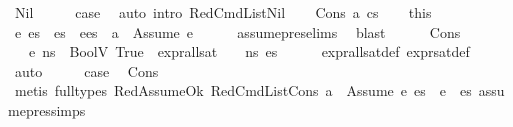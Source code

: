 \begin{isabellebody}
\ Nil\isanewline
\ \ \isamarkupfalse%
\ \isamarkupfalse%
\ {\isacharquery}{\kern0pt}case\ \isamarkupfalse%
\ {\isacharparenleft}{\kern0pt}auto\ intro{\isacharcolon}{\kern0pt}\ RedCmdListNil{\isacharparenright}{\kern0pt}\isanewline
{}\isamarkupfalse%
\isanewline
\ \ \isamarkupfalse%
\ {\isacharparenleft}{\kern0pt}Cons\ a\ cs{\isacharparenright}{\kern0pt}\isanewline
\ \ \isamarkupfalse%
\ this\ \isamarkupfalse%
\ e\ es{\isacharprime}{\kern0pt}\ \ {\isachardoublequoteopen}es\ {\isacharequal}{\kern0pt}\ e{\isacharhash}{\kern0pt}es{\isacharprime}{\kern0pt}{\isachardoublequoteclose}\ \ {\isachardoublequoteopen}a\ {\isacharequal}{\kern0pt}\ Assume\ e{\isachardoublequoteclose}\isanewline
\ \ \ \ \isamarkupfalse%
\ assume{\isacharunderscore}{\kern0pt}pres{\isachardot}{\kern0pt}elims{\isacharparenleft}{\kern0pt}{}{\isacharparenright}{\kern0pt}\ \isamarkupfalse%
\ blast\ \ \isanewline
\ \ \isamarkupfalse%
\ Cons\ \isamarkupfalse%
\ {\isachardoublequoteopen}{\isasymLambda}{\isacharcomma}{\kern0pt}{\isasymGamma}{\isacharcomma}{\kern0pt}{\isasymOmega}\ {\isasymturnstile}\ {\isasymlangle}e{\isacharcomma}{\kern0pt}\ ns{\isasymrangle}\ {\isasymDown}\ BoolV\ True{\isachardoublequoteclose}\ \ {\isachardoublequoteopen}expr{\isacharunderscore}{\kern0pt}all{\isacharunderscore}{\kern0pt}sat\ {\isasymLambda}\ {\isasymGamma}\ {\isasymOmega}\ ns\ es{\isacharprime}{\kern0pt}{\isachardoublequoteclose}\isanewline
\ \ \ \ \isamarkupfalse%
\ expr{\isacharunderscore}{\kern0pt}all{\isacharunderscore}{\kern0pt}sat{\isacharunderscore}{\kern0pt}def\ expr{\isacharunderscore}{\kern0pt}sat{\isacharunderscore}{\kern0pt}def\isanewline
\ \ \ \ \isamarkupfalse%
\ auto\isanewline
\ \ \isamarkupfalse%
\ \isamarkupfalse%
\ {\isacharquery}{\kern0pt}case\ \isamarkupfalse%
\ Cons\isanewline
\ \ \ \ \isamarkupfalse%
\ {\isacharparenleft}{\kern0pt}metis\ {\isacharparenleft}{\kern0pt}full{\isacharunderscore}{\kern0pt}types{\isacharparenright}{\kern0pt}\ RedAssumeOk\ RedCmdListCons\ {\isacartoucheopen}a\ {\isacharequal}{\kern0pt}\ Assume\ e{\isacartoucheclose}\ {\isacartoucheopen}es\ {\isacharequal}{\kern0pt}\ e\ {\isacharhash}{\kern0pt}\ es{\isacharprime}{\kern0pt}{\isacartoucheclose}\ assume{\isacharunderscore}{\kern0pt}pres{\isachardot}{\kern0pt}simps{\isacharparenleft}{\kern0pt}{}{\isacharparenright}{\kern0pt}{\isacharparenright}{\kern0pt}\isanewline

\end{isabellebody}
